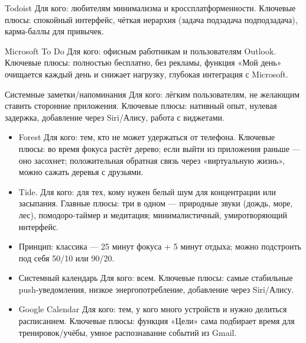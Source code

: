 Todoist Для кого: любителям минимализма и кроссплатформенности. Ключевые плюсы: спокойный интерфейс, чёткая иерархия (задача подзадача подподзадача), карма-баллы для привычек.

Microsoft To Do Для кого: офисным работникам и пользователям Outlook. Ключевые плюсы: полностью бесплатно, без рекламы, функция «Мой день» очищается каждый день и снижает нагрузку, глубокая интеграция с Microsoft.

Системные заметки/напоминания Для кого: лёгким пользователям, не желающим ставить сторонние приложения. Ключевые плюсы: нативный опыт, нулевая задержка, добавление через Siri/Алису, работа с виджетами.


\begin{itemize}
  \item Forest Для кого: тем, кто не может удержаться от телефона. Ключевые плюсы: во время фокуса растёт дерево; если выйти из приложения раньше — оно засохнет; положительная обратная связь через «виртуальную жизнь», можно сажать деревья с друзьями.
  \item Tide. Для кого: для тех, кому нужен белый шум для концентрации или засыпания. Главные плюсы: три в одном — природные звуки (дождь, море, лес), помодоро-таймер и медитация; минималистичный, умиротворяющий интерфейс.
  \item Принцип: классика — 25 минут фокуса + 5 минут отдыха; можно подстроить под себя 50/10 или 90/20.
\end{itemize}


\begin{itemize}
  \item Системный календарь Для кого: всем. Ключевые плюсы: самые стабильные push-уведомления, низкое энергопотребление, добавление через Siri/Алису.
  \item Google Calendar Для кого: тем, у кого много устройств и нужно делиться расписанием. Ключевые плюсы: функция «Цели» сама подбирает время для тренировок/учёбы, умное распознавание событий из Gmail.
\end{itemize}


